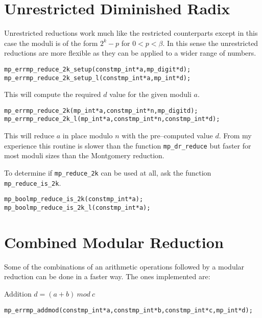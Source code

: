 \documentclass[synpaper]{book}
\def\mod{{\mathit\ mod\ }}
\begin{document}
\section{Unrestricted Diminished Radix}

Unrestricted reductions work much like the restricted counterparts except in this case the moduli is of the
form $2^k - p$ for $0 < p < \beta$.  In this sense the unrestricted reductions are more flexible as they
can be applied to a wider range of numbers.

\begin{alltt}
mp_err mp_reduce_2k_setup(const mp_int *a, mp_digit *d);
mp_err mp_reduce_2k_setup_l(const mp_int *a, mp_int *d);
\end{alltt}

This will compute the required $d$ value for the given moduli $a$.

\begin{alltt}
mp_err mp_reduce_2k(mp_int *a, const mp_int *n, mp_digit d);
mp_err mp_reduce_2k_l(mp_int *a, const mp_int *n, const mp_int *d);
\end{alltt}

This will reduce $a$ in place modulo $n$ with the pre--computed value $d$.  From my experience this routine is
slower than the function \texttt{mp\_dr\_reduce} but faster for most moduli sizes than the Montgomery reduction.

To determine if \texttt{mp\_reduce\_2k} can be used at all, ask the function \texttt{mp\_reduce\_is\_2k}.

\begin{alltt}
mp_bool mp_reduce_is_2k(const mp_int *a);
mp_bool mp_reduce_is_2k_l(const mp_int *a);
\end{alltt}

\section{Combined Modular Reduction}

Some of the combinations of an arithmetic operations followed by a modular reduction can be done in a faster way. The ones implemented are:

Addition $d = (a + b) \mod c$
\begin{alltt}
mp_err mp_addmod(const mp_int *a, const mp_int *b, const mp_int *c, mp_int *d);
\end{alltt}
\end{document}
